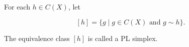 For each $h \in C(X)$, let

$$[h] = \{ g \mid g \in C(X) \text{ and } g \sim h \}.$$

The equivalence class $[h]$ is called a PL simplex.
